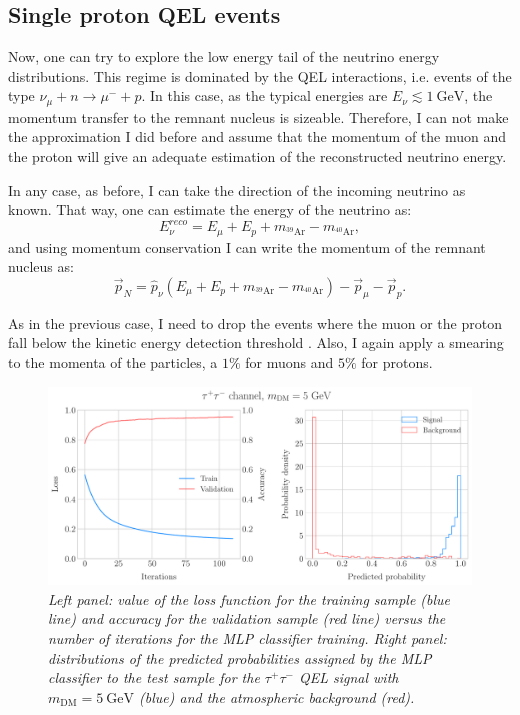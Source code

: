 \subsection{Single proton QEL events}

Now, one can try to explore the low energy tail of the neutrino energy distributions. This regime is dominated by the QEL interactions, i.e. events of the type $\nu_{\mu} + n \rightarrow \mu^{-} + p$. In this case, as the typical energies are $E_{\nu} \lesssim 1 \ \mathrm{GeV}$, the momentum transfer to the remnant nucleus is sizeable. Therefore, I can not make the approximation I did before and assume that the momentum of the muon and the proton will give an adequate estimation of the reconstructed neutrino energy.

In any case, as before, I can take the direction of the incoming neutrino as known. That way, one can estimate the energy of the neutrino as:
\begin{equation}\label{6.6}
	E_{\nu}^{reco} = E_{\mu} + E_{p} + m_{^{39}\mathrm{Ar}} - m_{^{40}\mathrm{Ar}},
\end{equation}
and using momentum conservation I can write the momentum of the remnant nucleus as:
\begin{equation}\label{6.7}
	\vec{p}_{N} = \hat{p}_{\nu} \left(E_{\mu} + E_{p} + m_{^{39}\mathrm{Ar}} - m_{^{40}\mathrm{Ar}}\right) - \vec{p}_{\mu} - \vec{p}_{p}.
\end{equation}

As in the previous case, I need to drop the events where the muon or the proton fall below the kinetic energy detection threshold \cite{DUNE2020TDR2}. Also, I again apply a smearing to the momenta of the particles, a $1\%$ for muons and $5\%$ for protons.

\begin{figure}[t]
	\centering
	\includegraphics[width=0.95\linewidth]{Images/DM_Analysis/solardm_tau_5_qel_classifier.pdf}
	\caption{\textit{Left panel: value of the loss function for the training sample (blue line) and accuracy for the validation sample (red line) versus the number of iterations for the MLP classifier training. Right panel: distributions of the predicted probabilities assigned by the MLP classifier to the test sample for the $\tau^{+}\tau^{-}$ QEL signal with $m_{\mathrm{DM}} = 5 \ \mathrm{GeV}$ (blue) and the atmospheric background (red).}}
	\label{fig:solardm_tau_5_qel_classifier}
\end{figure}

